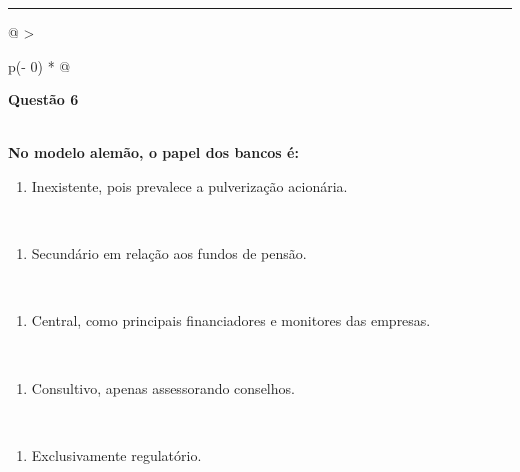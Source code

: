 \documentclass[
]{book}
\providecommand{\tightlist}{%
  \setlength{\itemsep}{0pt}\setlength{\parskip}{0pt}}
\begin{document}
\begin{center}\rule{0.5\linewidth}{0.5pt}\end{center}

\begin{longtable}[]{@{}
  >{\raggedright\arraybackslash}p{(\columnwidth - 0\tabcolsep) * }@{}}
\toprule\noalign{}
\begin{minipage}[b]{\linewidth}\raggedright
\textbf{Questão 6}
\end{minipage} \\
\midrule\noalign{}
\endhead
\bottomrule\noalign{}
\endlastfoot
\textbf{No modelo alemão, o papel dos bancos é:} \\
\begin{minipage}[t]{\linewidth}\raggedright
\begin{enumerate}
\def\labelenumi{\alph{enumi})}
\tightlist
\item
  Inexistente, pois prevalece a pulverização acionária.
\end{enumerate}
\end{minipage} \\
\begin{minipage}[t]{\linewidth}\raggedright
\begin{enumerate}
\def\labelenumi{\alph{enumi})}
\setcounter{enumi}{1}
\tightlist
\item
  Secundário em relação aos fundos de pensão.
\end{enumerate}
\end{minipage} \\
\begin{minipage}[t]{\linewidth}\raggedright
\begin{enumerate}
\def\labelenumi{\alph{enumi})}
\setcounter{enumi}{2}
\tightlist
\item
  Central, como principais financiadores e monitores das empresas.
\end{enumerate}
\end{minipage} \\
\begin{minipage}[t]{\linewidth}\raggedright
\begin{enumerate}
\def\labelenumi{\alph{enumi})}
\setcounter{enumi}{3}
\tightlist
\item
  Consultivo, apenas assessorando conselhos.
\end{enumerate}
\end{minipage} \\
\begin{minipage}[t]{\linewidth}\raggedright
\begin{enumerate}
\def\labelenumi{\alph{enumi})}
\setcounter{enumi}{4}
\tightlist
\item
  Exclusivamente regulatório.
\end{enumerate}
\end{minipage} \\
 \\
\end{longtable}
\end{document}
